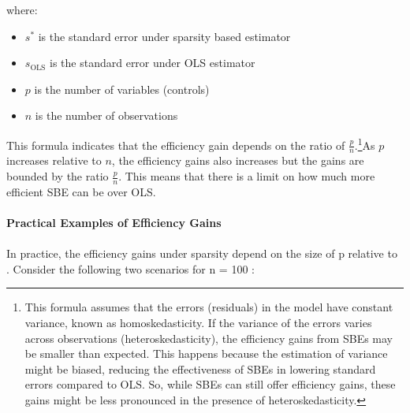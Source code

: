 where:
\begin{itemize}
    \item $s^*$ is the standard error under sparsity based estimator
    \item $s_\text{OLS}$ is the standard error under OLS estimator
    \item $p$ is the number of variables (controls) 
    \item $n$ is the number of observations
\end{itemize}
This formula indicates that the efficiency gain depends on the ratio of $\frac{p}{n}$.\footnote{This formula assumes that the errors (residuals) in the model have constant variance, known as homoskedasticity. If the variance of the errors varies across observations (heteroskedasticity), the efficiency gains from SBEs may be smaller than expected. This happens because the estimation of variance might be biased, reducing the effectiveness of SBEs in lowering standard errors compared to OLS. So, while SBEs can still offer efficiency gains, these gains might be less pronounced in the presence of heteroskedasticity.}As $p$ increases relative to $n$, the efficiency gains also increases but the gains are bounded by the ratio $\frac{p}{n}$. This means that there is a limit on how much more efficient SBE can be over OLS. 
\\
\\
\textbf{Practical Examples of Efficiency Gains}\\
\\
In practice, the efficiency gains under sparsity depend on the size of  p  relative to . Consider the following two scenarios for  n = 100 :
